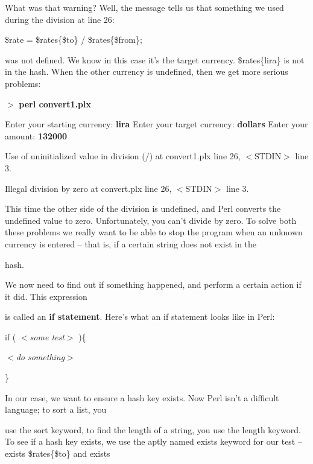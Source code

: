 \documentclass[a4paper,11pt]{book}
\begin{document}
\noindent 

\noindent What was that warning? Well, the message tells us that something we used during the division at line 26:

\noindent 

\noindent 

\noindent \$rate = \$rates\{\$to\} / \$rates\{\$from\};

\noindent 

\noindent was not defined. We know in this case it's the target currency. \$rates\{lira\} is not in the hash. When the other currency is undefined, then we get more serious problems:

\noindent 

\noindent $>$ \textbf{perl convert1.plx}

\noindent Enter your starting currency: \textbf{lira }Enter your target currency: \textbf{dollars }Enter your amount: \textbf{132000}

\noindent Use of uninitialized value in division (/) at convert1.plx line 26, $<$STDIN$>$ line 3.

\noindent Illegal division by zero at convert.plx line 26, $<$STDIN$>$ line 3.

\noindent 

\noindent This time the other side of the division is undefined, and Perl converts the undefined value to zero. Unfortunately, you can't divide by zero. To solve both these problems we really want to be able to stop the program when an unknown currency is entered -- that is, if a certain string does not exist in the

\noindent hash.

\noindent 

\noindent We now need to find out if something happened, and perform a certain action if it did. This expression

\noindent is called an \textbf{if statement}. Here's what an if statement looks like in Perl:

\noindent 

\noindent 

\noindent if ( \textit{$<$some test$>$ })\{ 

\noindent \textit{$<$do something$>$}

\noindent \}

\noindent 

\noindent In our case, we want to ensure a hash key exists. Now Perl isn't a difficult language; to sort a list, you

\noindent use the sort keyword, to find the length of a string, you use the length keyword. To see if a hash key exists, we use the aptly named exists keyword for our test -- exists \$rates\{\$to\} and exists
\end{document}

